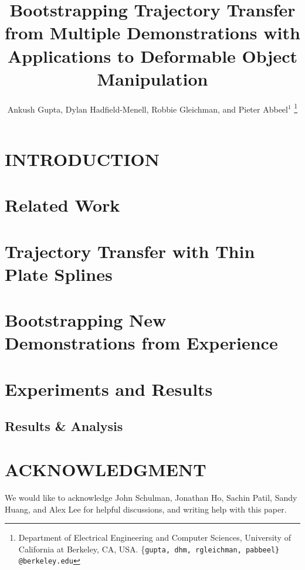 \documentclass[a4paper, 10pt, conference]{ieeeconf}      %
\title{\LARGE \bf
Bootstrapping Trajectory Transfer from Multiple Demonstrations with Applications to Deformable Object Manipulation
}
\author{Ankush Gupta, Dylan Hadfield-Menell, Robbie Gleichman, and Pieter Abbeel$^{1}$%
\thanks{Department of Electrical Engineering and Computer Sciences, University of California at Berkeley, CA, USA.
  \{\tt\small gupta, dhm, rgleichman, pabbeel\} @berkeley.edu}}
\begin{document}

\maketitle
\thispagestyle{empty}
\pagestyle{empty}


\begin{abstract}

\end{abstract}


\section{INTRODUCTION}

\section{Related Work}


\section{Trajectory Transfer with Thin Plate Splines}


\section{Bootstrapping New Demonstrations from Experience}


\section{Experiments and Results}

\subsection{Results \& Analysis}












\section*{ACKNOWLEDGMENT}

We would like to acknowledge John Schulman, Jonathan Ho, Sachin Patil, Sandy Huang, and Alex Lee for 
helpful discussions, and writing help with this paper.




\end{document}
